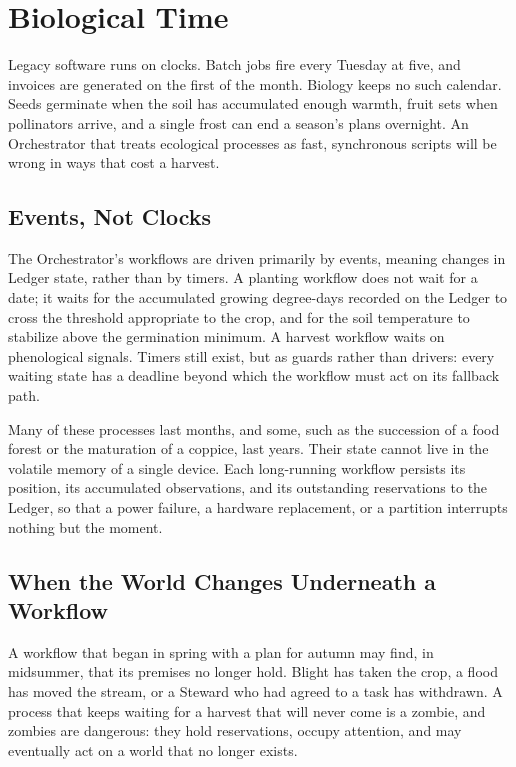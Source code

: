 \section{Biological Time}

Legacy software runs on clocks. Batch jobs fire every Tuesday at five, and invoices are generated on the first of the month. Biology keeps no such calendar. Seeds germinate when the soil has accumulated enough warmth, fruit sets when pollinators arrive, and a single frost can end a season's plans overnight. An Orchestrator that treats ecological processes as fast, synchronous scripts will be wrong in ways that cost a harvest.

\subsection{Events, Not Clocks}

The Orchestrator's workflows are driven primarily by events, meaning changes in Ledger state, rather than by timers. A planting workflow does not wait for a date; it waits for the accumulated growing degree-days recorded on the Ledger to cross the threshold appropriate to the crop, and for the soil temperature to stabilize above the germination minimum. A harvest workflow waits on phenological signals. Timers still exist, but as guards rather than drivers: every waiting state has a deadline beyond which the workflow must act on its fallback path.

Many of these processes last months, and some, such as the succession of a food forest or the maturation of a coppice, last years. Their state cannot live in the volatile memory of a single device. Each long-running workflow persists its position, its accumulated observations, and its outstanding reservations to the Ledger, so that a power failure, a hardware replacement, or a partition interrupts nothing but the moment.

\subsection{When the World Changes Underneath a Workflow}

A workflow that began in spring with a plan for autumn may find, in midsummer, that its premises no longer hold. Blight has taken the crop, a flood has moved the stream, or a Steward who had agreed to a task has withdrawn. A process that keeps waiting for a harvest that will never come is a zombie, and zombies are dangerous: they hold reservations, occupy attention, and may eventually act on a world that no longer exists.

